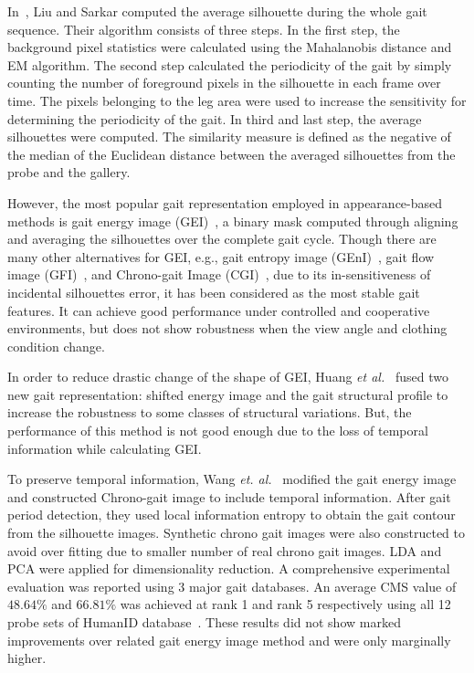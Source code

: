 In~\cite{Liu_04}, Liu and Sarkar computed the average silhouette during the whole gait sequence. Their algorithm consists of three steps. In the first step, the background pixel statistics were calculated using the Mahalanobis distance and EM algorithm. The second step calculated the periodicity of the gait by simply counting the number of foreground pixels in the silhouette in each frame over time. The pixels belonging to the leg area were used to increase the sensitivity for determining the periodicity of the gait. In third and last step, the average silhouettes were computed. The similarity measure is defined as the negative of the median of the Euclidean distance between the averaged silhouettes from the probe and the gallery.

However, the most popular gait representation employed in appearance-based methods is gait energy image (GEI)~\cite{Han_06}, a binary mask computed through aligning and averaging the silhouettes over the complete gait cycle. Though there are many other alternatives for GEI, e.g., gait entropy image (GEnI)~\cite{Bashir_09}, gait flow image (GFI)~\cite{Lam_11}, and Chrono-gait Image (CGI)~\cite{Wang_12}, due to its in-sensitiveness of incidental silhouettes error, it has been considered as the most stable gait features.  It can achieve good performance under controlled and cooperative environments, but does not show robustness when the view angle and clothing condition change. 

In order to reduce drastic change of the shape of GEI, Huang \textit{et al.}~\cite{Huang_12} fused two new gait representation: shifted energy image and the gait structural profile to increase the robustness to some classes of structural variations. But, the performance of this method is not good enough due to the loss of temporal information while calculating GEI. 

To preserve temporal information, Wang \textit{et. al.}~\cite{Wang_12} modified the gait energy image and constructed Chrono-gait image to include temporal information. After gait period detection, they used local information entropy to obtain the gait contour from the silhouette images. Synthetic chrono gait images were also constructed to avoid over fitting due to smaller number of real chrono gait images. LDA and PCA were applied for dimensionality reduction. A comprehensive experimental evaluation was reported using 3 major gait databases. An average CMS value of $ 48.64\% $ and $ 66.81\% $ was achieved at rank 1 and rank 5 respectively using all 12 probe sets of HumanID database~\cite{Sarkar_05}. These results did not show marked improvements over related gait energy image method and were only marginally higher.


